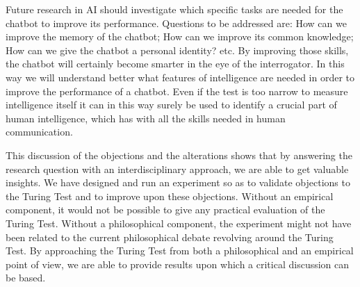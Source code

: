  Future research in AI should investigate which specific tasks are needed for the chatbot to improve its performance. Questions to be addressed are: How can we improve the memory of the chatbot; How can we improve its common knowledge; How can we give the chatbot a personal identity? etc. By improving those skills, the chatbot will certainly become smarter in the eye of the interrogator. In this way we will understand better what features of intelligence are needed in order to improve the performance of a chatbot. Even if the test is too narrow to measure intelligence itself it can in this way surely be used to identify a crucial part of human intelligence, which has with all the skills needed in human communication.

This discussion of the objections and the alterations shows that by answering the research question with an interdisciplinary approach, we are able to get valuable insights. We have designed and run an experiment so as to validate objections to the Turing Test and to improve upon these objections. Without an empirical component, it would not be possible to give any practical evaluation of the Turing Test. Without a philosophical component, the experiment might not have been related to the current philosophical debate revolving around the Turing Test. By approaching the Turing Test from both a philosophical and an empirical point of view, we are able to provide results upon which a critical discussion can be based.
